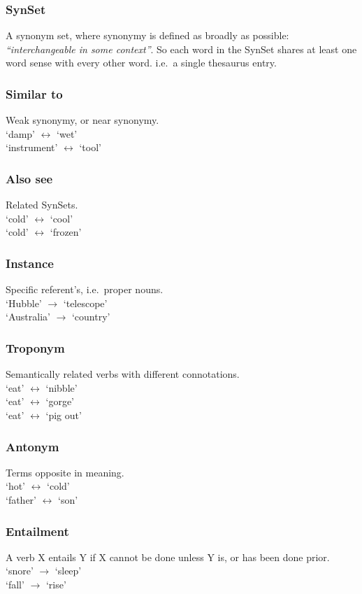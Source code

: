 \subsubsection{SynSet}
A synonym set, where synonymy is defined as broadly as possible: \textit{``interchangeable in some context''}. So each word in the SynSet shares at least one word sense with every other word. i.e.\ a single thesaurus entry.

\subsubsection{Similar to}
Weak synonymy, or near synonymy. \\
`damp' $\leftrightarrow$ `wet' \\
`instrument' $\leftrightarrow$ `tool'

\subsubsection{Also see}
Related SynSets. \\
`cold' $\leftrightarrow$ `cool' \\
`cold' $\leftrightarrow$ `frozen'

\subsubsection{Instance}
Specific referent's, i.e.\ proper nouns. \\
`Hubble' $\rightarrow$ `telescope' \\
`Australia' $\rightarrow$ `country'

\subsubsection{Troponym}
Semantically related verbs with different connotations. \\
`eat' $\leftrightarrow$ `nibble' \\
`eat' $\leftrightarrow$ `gorge' \\
`eat' $\leftrightarrow$ `pig out'

\subsubsection{Antonym}
Terms opposite in meaning. \\ 
`hot' $\leftrightarrow$ `cold' \\
`father' $\leftrightarrow$ `son'

\subsubsection{Entailment} 
A verb X entails Y if X cannot be done unless Y is, or has been done prior. \\
`snore' $\rightarrow$ `sleep' \\
`fall' $\rightarrow$ `rise'


